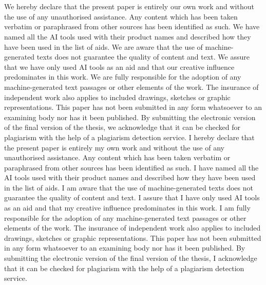
\textbf{\thetitle}\\
\ifshowsubtitle\textbf{\thesubtitle}\\\fi

\vspace{0.5em}

\ifplural
We hereby declare that the present paper is entirely our own work and
without the use of any unauthorised assistance. Any content which has
been taken verbatim or paraphrased from other sources has been
identified as such. We have named all the AI tools used with their
product names and described how they have been used in the list of aids.
We are aware that the use of machine-generated texts does not guarantee
the quality of content and text. We assure that we have only used AI
tools as an aid and that our creative influence predominates in this
work. We are fully responsible for the adoption of any machine-generated
text passages or other elements of the work. The insurance of
independent work also applies to included drawings, sketches or graphic
representations. This paper has not been submitted in any form
whatsoever to an examining body nor has it been published. By submitting
the electronic version of the final version of the thesis, we
acknowledge that it can be checked for plagiarism with the help of a
plagiarism detection service.
\else
I hereby declare that the present paper is entirely my own work and
without the use of any unauthorised assistance. Any content which has
been taken verbatim or paraphrased from other sources has been
identified as such. I have named all the AI tools used with their
product names and described how they have been used in the list of aids.
I am aware that the use of machine-generated texts does not guarantee
the quality of content and text. I assure that I have only used AI tools
as an aid and that my creative influence predominates in this work. I am
fully responsible for the adoption of any machine-generated text
passages or other elements of the work. The insurance of independent
work also applies to included drawings, sketches or graphic
representations. This paper has not been submitted in any form
whatsoever to an examining body nor has it been published. By submitting
the electronic version of the final version of the thesis, I acknowledge
that it can be checked for plagiarism with the help of a plagiarism
detection service.
\fi

